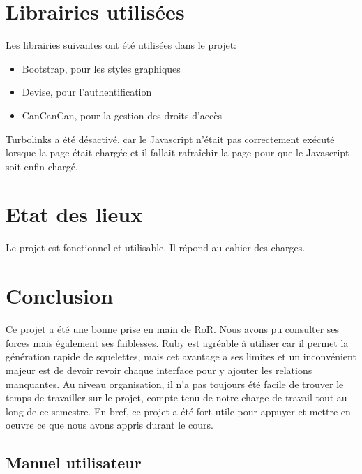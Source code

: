 \documentclass{article}
\begin{document}
\section{Librairies utilisées}

Les librairies suivantes ont été utilisées dans le projet:

\begin{itemize}
\item Bootstrap, pour les styles graphiques
\item Devise, pour l'authentification
\item CanCanCan, pour la gestion des droits d'accès
\end{itemize}

\par\null\par

Turbolinks a été désactivé, car le Javascript n'était pas correctement exécuté lorsque la page était chargée et il fallait rafraîchir la page pour que le Javascript soit enfin chargé.

\section{Etat des lieux}

Le projet est fonctionnel et utilisable. Il répond au cahier des charges.

\newpage
\section{Conclusion}

Ce projet a été une bonne prise en main de RoR. Nous avons pu consulter ses forces mais également ses faiblesses. Ruby est agréable à utiliser car il permet la génération rapide de squelettes, mais cet avantage a ses limites et un inconvénient majeur est de devoir revoir chaque interface pour y ajouter les relations manquantes. Au niveau organisation, il n'a pas toujours été facile de trouver le temps de travailler sur le projet, compte tenu de notre charge de travail tout au long de ce semestre. En bref, ce projet a été fort utile pour appuyer et mettre en oeuvre ce que nous avons appris durant le cours.

\printbibliography

\newpage
\begin{appendices}

\newpage
\section{Manuel utilisateur}
\end{appendices}
\end{document}
